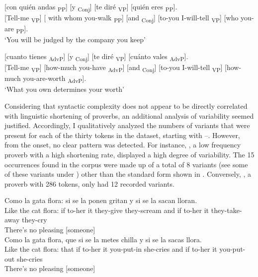 \documentclass[output=paper,colorlinks,citecolor=brown,draftmode]{langscibook}
\begin{document}
\ea
{}	{[{con 	quién andas} \textsubscript{PP}]}  	{[{y} \textsubscript{Conj}]}  {[{te dir\'e} \textsubscript{VP}]} {[{quién eres} \textsubscript{PP}]}. \\
{[{Tell-me} \textsubscript{VP}]}	{[{ 	with whom you-walk } \textsubscript{PP}]}  	{[{and} \textsubscript{Conj}]}  {[{to-you I-will-tell } \textsubscript{VP}]} {[{who you-are } \textsubscript{PP}]}.\\
\glt ‘You will be judged by the company you keep’\\ \label{item:comp1}
\z

\ea
{}	{[{cuanto tienes} \textsubscript{AdvP}]}  	{[{y} \textsubscript{Conj}]}  {[{te dir\'e} \textsubscript{VP}]} {[{cuánto vales } \textsubscript{AdvP}]}. \\
{[{Tell-me} \textsubscript{VP}]}	{[{how-much you-have } \textsubscript{AdvP}]}  	{[{and} \textsubscript{Conj}]}  {[{to-you I-will-tell } \textsubscript{VP}]} {[{how-much you-are-worth} \textsubscript{AdvP}]}.\\
\glt ‘What you own determines your worth’\\ \label{item:comp2}
\z

Considering that syntactic complexity does not appear to be directly correlated with linguistic shortening of proverbs, an additional analysis of variability seemed justified. Accordingly, I qualitatively analyzed the numbers of variants that were present for each of the thirty tokens in the dataset, starting with --. However, from the onset, no clear pattern was detected. For instance, , a low frequency proverb with a high shortening rate, displayed a high degree of variability. The 15 occurrences found in the corpus were made up of a total of 8 variants (see some of these variants under ) other than the standard form shown in \citep{pedicone2004refranero}. Conversely, , a proverb with 286 tokens, only had 12 recorded variants.

\ea
\label{item:gata_variants}
\ea 
\gll Como la gata flora: si se la ponen gritan y si se la sacan lloran.\\
Like 	the 	cat 	flora: 	if 	to-her 	it 	they-give  they-scream 	and 	if 	to-her 	it 	they-take-away they-cry\\
\glt There’s no pleasing [someone]\\

\ex 
\gll Como la gata flora, que si se la metes chilla y si se la sacas llora.\\
Like 	the 	cat 	flora: 	that 	if 	to-her 	it you-put-in 	she-cries	and	if	to-her 	it you-put-out 	she-cries\\
\glt There’s no pleasing [someone]\\
\end{document}
